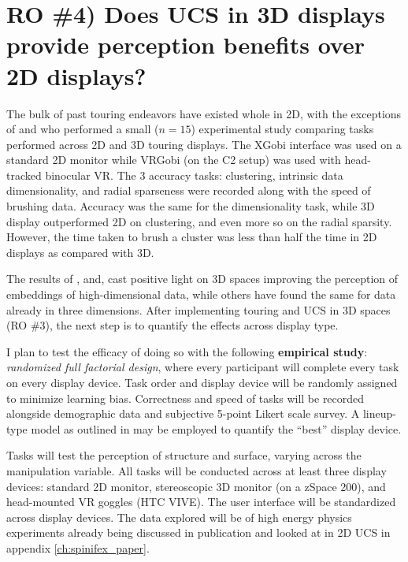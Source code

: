 \documentclass{monashthesis}
\begin{document}
\section{RO \#4) Does UCS in 3D displays provide perception benefits
over 2D displays?}\label{UCS_3dvs2d}

The bulk of past touring endeavors have existed whole in 2D, with the
exceptions of \textcite{nelson_xgobi_1998} and
\textcite{arms_benefits_1999} who performed a small (\(n=15\))
experimental study comparing tasks performed across 2D and 3D touring
displays. The XGobi interface was used on a standard 2D monitor while
VRGobi (on the C2 setup) was used with head-tracked binocular VR. The 3
accuracy tasks: clustering, intrinsic data dimensionality, and radial
sparseness were recorded along with the speed of brushing data. Accuracy
was the same for the dimensionality task, while 3D display outperformed
2D on clustering, and even more so on the radial sparsity. However, the
time taken to brush a cluster was less than half the time in 2D displays
as compared with 3D.

The results of \textcite{wagner_filho_immersive_2018},
\textcite{nelson_xgobi_1998} and, \textcite{arms_benefits_1999} cast
positive light on 3D spaces improving the perception of embeddings of
high-dimensional data, while others have found the same for data already
in three dimensions. After implementing touring and UCS in 3D spaces (RO
\#3), the next step is to quantify the effects across display type.

I plan to test the efficacy of doing so with the following
\textbf{empirical study}: \emph{randomized full factorial design}, where
every participant will complete every task on every display device. Task
order and display device will be randomly assigned to minimize learning
bias. Correctness and speed of tasks will be recorded alongside
demographic data and subjective 5-point Likert scale survey. A
lineup-type model as outlined in \textcite{hofmann_graphical_2012} may
be employed to quantify the ``best'' display device.

Tasks will test the perception of structure and surface, varying across
the manipulation variable. All tasks will be conducted across at least
three display devices: standard 2D monitor, stereoscopic 3D monitor (on
a zSpace 200), and head-mounted VR goggles (HTC VIVE). The user
interface will be standardized across display devices. The data explored
will be of high energy physics experiments already being discussed in
publication \autocites{wang_visualizing_2018}{cook_dynamical_2018} and
looked at in 2D UCS in appendix \ref{ch:spinifex_paper}.
\end{document}
